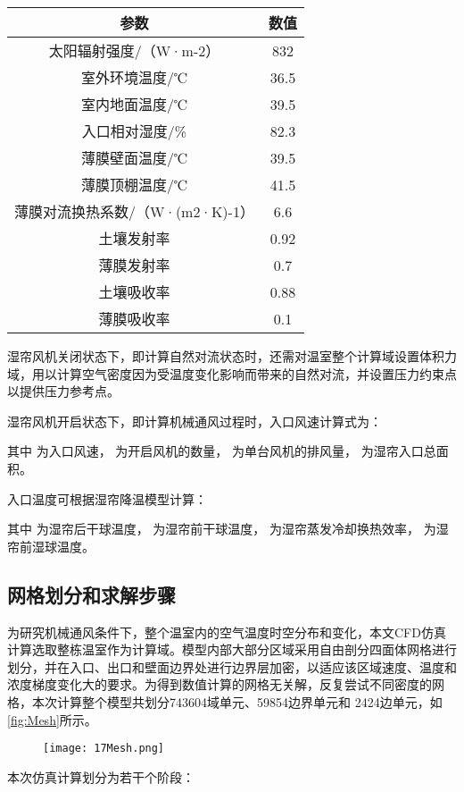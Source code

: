 		\begin{table}[!hpb]
  			\centering
  			\begin{tabular}{cc} \toprule
			参数 & 数值\\ \midrule
			太阳辐射强度/（W·m-2） & 	832\\
			室外环境温度/℃	 & 36.5\\
			室内地面温度/℃ & 	39.5\\
			入口相对湿度/\%	 & 82.3\\
			薄膜壁面温度/℃	 & 39.5\\
			薄膜顶棚温度/℃	 & 41.5\\
			薄膜对流换热系数/（W·(m2·K)-1） & 6.6\\
			土壤发射率 & 0.92\\
			薄膜发射率 & 0.7\\
			土壤吸收率 & 0.88\\
			薄膜吸收率 & 0.1\\ \bottomrule
 			\end{tabular}
		\end{table}
湿帘风机关闭状态下，即计算自然对流状态时，还需对温室整个计算域设置体积力域，用以计算空气密度因为受温度变化影响而带来的自然对流，并设置压力约束点以提供压力参考点。

湿帘风机开启状态下，即计算机械通风过程时，入口风速计算式为：

其中 为入口风速， 为开启风机的数量， 为单台风机的排风量， 为湿帘入口总面积。

入口温度可根据湿帘降温模型计算：

其中 为湿帘后干球温度， 为湿帘前干球温度， 为湿帘蒸发冷却换热效率， 为湿帘前湿球温度。

	\subsection{网格划分和求解步骤}
为研究机械通风条件下，整个温室内的空气温度时空分布和变化，本文CFD仿真计算选取整栋温室作为计算域。模型内部大部分区域采用自由剖分四面体网格进行划分，并在入口、出口和壁面边界处进行边界层加密，以适应该区域速度、温度和浓度梯度变化大的要求。为得到数值计算的网格无关解，反复尝试不同密度的网格，本次计算整个模型共划分743604域单元、59854边界单元和 2424边单元，如\ref{fig:Mesh}所示。
 	  	\begin{figure}[!htp]
  			\centering
 			\texttt{[image: 17Mesh.png]}
		\end{figure}
本次仿真计算划分为若干个阶段：

